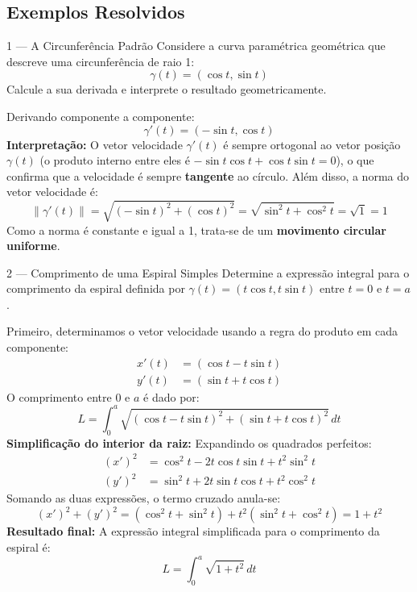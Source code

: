 \subsection{Exemplos Resolvidos}

\begin{exbox}{1 --- A Circunferência Padrão}
  Considere a curva paramétrica geométrica que descreve uma circunferência de raio 1:
  \[
    \gamma(t) = (\cos t, \sin t)
  \]
  Calcule a sua derivada e interprete o resultado geometricamente.
\end{exbox}
\begin{solbox}
  Derivando componente a componente:
  \[
    \gamma'(t) = (-\sin t, \cos t)
  \]
  \textbf{Interpretação:} O vetor velocidade $\gamma'(t)$ é sempre ortogonal ao vetor posição $\gamma(t)$ (o produto interno entre eles é $-\sin t \cos t + \cos t \sin t = 0$), o que confirma que a velocidade é sempre \textbf{tangente} ao círculo. Além disso, a norma do vetor velocidade é:
  \[
    \|\gamma'(t)\| = \sqrt{(-\sin t)^2 + (\cos t)^2} = \sqrt{\sin^2 t + \cos^2 t} = \sqrt{1} = 1
  \]
  Como a norma é constante e igual a 1, trata-se de um \textbf{movimento circular uniforme}.
\end{solbox}

\begin{exbox}{2 --- Comprimento de uma Espiral Simples}
  Determine a expressão integral para o comprimento da espiral definida por $\gamma(t)=(t\cos t, t\sin t)$ entre $t=0$ e $t=a$.
\end{exbox}
\begin{solbox}
  Primeiro, determinamos o vetor velocidade usando a regra do produto em cada componente:
  \begin{align*}
      x'(t) &= (\cos t - t\sin t) \\
      y'(t) &= (\sin t + t\cos t)
  \end{align*}
  O comprimento entre $0$ e $a$ é dado por:
  \[
    L = \int_0^a \sqrt{(\cos t - t\sin t)^2 + (\sin t + t\cos t)^2} \,dt
  \]
  \textbf{Simplificação do interior da raiz:}
  Expandindo os quadrados perfeitos:
  \begin{align*}
      (x')^2 &= \cos^2 t - 2t\cos t\sin t + t^2\sin^2 t \\
      (y')^2 &= \sin^2 t + 2t\sin t\cos t + t^2\cos^2 t
  \end{align*}
  Somando as duas expressões, o termo cruzado anula-se:
  \[
    (x')^2 + (y')^2 = (\cos^2 t + \sin^2 t) + t^2(\sin^2 t + \cos^2 t) = 1 + t^2
  \]
  \textbf{Resultado final:}
  A expressão integral simplificada para o comprimento da espiral é:
  \[
    \boxed{ L = \int_0^a \sqrt{1+t^2} \,dt }
  \]
\end{solbox}

